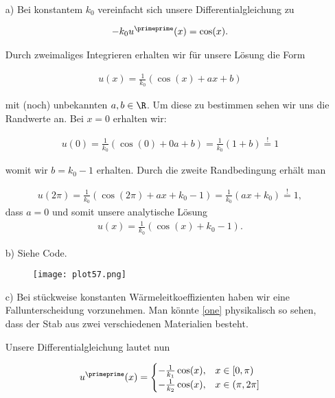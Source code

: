 \begin{solution}\leavevmode \\
  \begin{itemize}
    \item[a)] Bei konstantem $k_0$ vereinfacht sich unsere Differentialgleichung zu

    \begin{align*}
      -k_0 u ^\primeprime(x) = \cos(x).
    \end{align*}

    Durch zweimaliges Integrieren erhalten wir für unsere Lösung die Form

    \begin{align*}
      u(x)
      =
      \frac{1}{k_0}(\cos(x)+ax+b)
    \end{align*}

    mit (noch) unbekannten $a,b \in \R$. Um diese zu bestimmen sehen wir uns die
    Randwerte an. Bei $x=0$ erhalten wir:

    \begin{align*}
      u(0)
      = \frac{1}{k_0}(\cos(0)+0a+b) =
      \frac{1}{k_0}(1+b)
      \stackrel{!}{=}
      1
    \end{align*}

    womit wir $b = k_0 -1$ erhalten. Durch die zweite Randbedingung erhält man

    \begin{align*}
      u(2\pi) = \frac{1}{k_0}(\cos(2\pi) + ax + k_0 - 1) =
      \frac{1}{k_0}(ax + k_0) \stackrel{!}{=} 1,
    \end{align*}
    dass $a = 0$ und somit unsere analytische Lösung
    \begin{align*}
      u(x)
      =
      \frac{1}{k_0}(\cos(x)+k_0-1).
    \end{align*}
    \FloatBarrier
    \item[b)] Siehe Code.
    \begin{figure}
        \centering
        \texttt{[image: plot57.png]}
    \end{figure}

    \item[c)] Bei stückweise konstanten Wärmeleitkoeffizienten haben wir eine
    Fallunterscheidung vorzunehmen. Man könnte \eqref{one} physikalisch so sehen,
    dass der Stab aus zwei verschiedenen Materialien besteht.

    Unsere Differentialgleichung lautet nun

    \begin{align*}
      u^\primeprime(x)
      =
      \begin{cases}
        -\frac{1}{k_1} \cos(x), & x \in [0,\pi) \\
        -\frac{1}{k_2} \cos(x), & x \in (\pi, 2\pi]
      \end{cases}
    \end{align*}


\end{itemize}
\end{solution}
